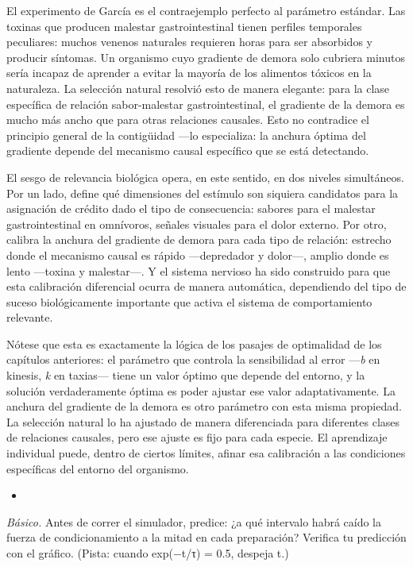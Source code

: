 \documentclass[
  letterpaper,
  DIV=11,
  numbers=noendperiod]{scrreprt}
\providecommand{\tightlist}{%
  \setlength{\itemsep}{0pt}\setlength{\parskip}{0pt}}
\begin{document}
\begin{tcolorbox}[enhanced jigsaw, arc=.35mm, bottomrule=.15mm, breakable, colback=white, colframe=quarto-callout-note-color-frame, left=2mm, leftrule=.75mm, opacityback=0, rightrule=.15mm, toprule=.15mm]
El experimento de García es el contraejemplo perfecto al parámetro
estándar. Las toxinas que producen malestar gastrointestinal tienen
perfiles temporales peculiares: muchos venenos naturales requieren horas
para ser absorbidos y producir síntomas. Un organismo cuyo gradiente de
demora solo cubriera minutos sería incapaz de aprender a evitar la
mayoría de los alimentos tóxicos en la naturaleza. La selección natural
resolvió esto de manera elegante: para la clase específica de relación
sabor-malestar gastrointestinal, el gradiente de la demora es mucho más
ancho que para otras relaciones causales. Esto no contradice el
principio general de la contigüidad ---lo especializa: la anchura óptima
del gradiente depende del mecanismo causal específico que se está
detectando.

El sesgo de relevancia biológica opera, en este sentido, en dos niveles
simultáneos. Por un lado, define qué dimensiones del estímulo son
siquiera candidatos para la asignación de crédito dado el tipo de
consecuencia: sabores para el malestar gastrointestinal en omnívoros,
señales visuales para el dolor externo. Por otro, calibra la anchura del
gradiente de demora para cada tipo de relación: estrecho donde el
mecanismo causal es rápido ---depredador y dolor---, amplio donde es
lento ---toxina y malestar---. Y el sistema nervioso ha sido construido
para que esta calibración diferencial ocurra de manera automática,
dependiendo del tipo de suceso biológicamente importante que activa el
sistema de comportamiento relevante.

Nótese que esta es exactamente la lógica de los pasajes de optimalidad
de los capítulos anteriores: el parámetro que controla la sensibilidad
al error ---\emph{b} en kinesis, \emph{k} en taxias--- tiene un valor
óptimo que depende del entorno, y la solución verdaderamente óptima es
poder ajustar ese valor adaptativamente. La anchura del gradiente de la
demora es otro parámetro con esta misma propiedad. La selección natural
lo ha ajustado de manera diferenciada para diferentes clases de
relaciones causales, pero ese ajuste es fijo para cada especie. El
aprendizaje individual puede, dentro de ciertos límites, afinar esa
calibración a las condiciones específicas del entorno del organismo.

\begin{itemize}
\tightlist
\item
\end{itemize}

\emph{Básico.} Antes de correr el simulador, predice: ¿a qué intervalo
habrá caído la fuerza de condicionamiento a la mitad en cada
preparación? Verifica tu predicción con el gráfico. (Pista: cuando
exp(−t/τ) = 0.5, despeja t.)


\end{tcolorbox}
\end{document}
